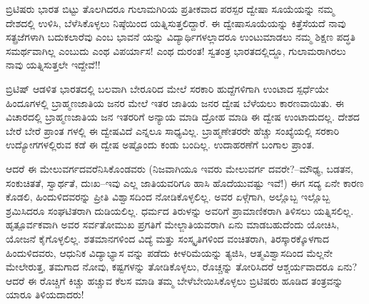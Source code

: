 ಬ್ರಿಟಿಷರು ಭಾರತ ಬಿಟ್ಟು ತೊಲಗಿದರೂ ಗುಲಾಮಗಿರಿಯ ಪ್ರತೀಕವಾದ ಪರಸ್ಪರ ದ್ವೇಷಾ ಸೂಯೆಯನ್ನು ನಮ್ಮ ದೇಶದಲ್ಲಿ ಉಳಿಸಿ, ಬೆಳೆಸಿಕೊಳ್ಳಲು ನಿಷ್ಠೆಯಿಂದ ಯತ್ನಿಸುತ್ತಲಿದ್ದಾರೆ. ಈ ದ್ವೇಷಾಸೂಯೆಯನ್ನು ಕಿತ್ತೆಸೆಯದೆ ನಾವು ಸತ್ಪ್ರಜೆಗಳಾಗಿ ಬದುಕಲಾರೆವು ಎಂಬ ಭಾವನೆ ಯನ್ನು ವಿದ್ಯಾರ್ಥಿಗಳಲ್ಲಾದರೂ ಉಂಟುಮಾಡಲು ನಮ್ಮ ಶಿಕ್ಷಣ ಪದ್ಧತಿ ಸಮರ್ಥವಾಗಿಲ್ಲ ಎಂಬುದು ಎಂಥ ವಿಪರ್ಯಾಸ! ಎಂಥ ದುರಂತ! ಸ್ವತಂತ್ರ ಭಾರತದಲ್ಲಿದ್ದೂ, ಗುಲಾಮರಾಗಿರಲು ನಾವು ಯತ್ನಿಸುತ್ತಲೇ ಇದ್ದೇವೆ!!

ಬ್ರಿಟಿಷ್ ಆಡಳಿತ ಭಾರತದಲ್ಲಿ ಬಲವಾಗಿ ಬೇರೂರಿದ ಮೇಲೆ ಸರಕಾರಿ ಹುದ್ದೆಗಳಿಗಾಗಿ ಉಂಟಾದ ಸ್ಪರ್ಧೆಯೇ ಹಿಂದೂಗಳಲ್ಲಿ ಬ್ರಾಹ್ಮಣಜಾತಿಯ ಜನರ ಮೇಲೆ ಇತರ ಜಾತಿಯ ಜನರ ದ್ವೇಷ ಬೆಳೆಯಲು ಕಾರಣವಾಯಿತು. ಈ ವಿಚಾರದಲ್ಲಿ ಬ್ರಾಹ್ಮಣಜಾತಿಯ ಜನ ಇತರರಿಗೆ ಅನ್ಯಾಯ ಮಾಡಿ ದ್ರೋಹ ಮಾಡಿ ಈ ದ್ವೇಷ ಉಂಟಾದುದಲ್ಲ. ದೇಶದ ಬೇರೆ ಬೇರೆ ಪ್ರಾಂತ ಗಳಲ್ಲಿ ಈ ದ್ವೇಷವಿದೆ ಎನ್ನಲೂ ಸಾಧ್ಯವಿಲ್ಲ. ಬ್ರಾಹ್ಮಣೇತರರೇ ಹೆಚ್ಚು ಸಂಖ್ಯೆಯಲ್ಲಿ ಸರಕಾರಿ ಉದ್ಯೋಗಗಳಲ್ಲಿರುವ ಕಡೆ ಈ ದ್ವೇಷ ಅಷ್ಟೊಂದು ಕಂಡು ಬಂದಿಲ್ಲ. ಉದಾಹರಣೆಗೆ ಬಂಗಾಲ ಪ್ರಾಂತ.

ಆದರೆ ಈ ಮೇಲುವರ್ಗದವರೆನಿಸಿಕೊಂಡವರು (ನಿಜವಾಗಿಯೂ ಇವರು ಮೇಲುವರ್ಗ ದವರೇ?–ಮೌಢ್ಯ, ಬಡತನ, ಸಂಕುಚಿತತೆ, ಸ್ವಾರ್ಥತೆ, ದುಃಖ–ಇವು ಎಲ್ಲ ಜಾತಿಯವರಿಗೂ ಹಾಸಿ ಹೊದೆಯುವಷ್ಟು ಇವೆ!) ಈಗ ಸದ್ಯ ಏನೇ ಕಾರಣ ಕೊಡಲಿ, ಹಿಂದುಳಿದವರನ್ನು ಪ್ರೀತಿ ವಿಶ್ವಾಸದಿಂದ ನೋಡಿಕೊಳ್ಳಲಿಲ್ಲ. ಅವರ ಏಳ್ಗೆಗಾಗಿ, ಅಲ್ಲೊಬ್ಬ ಇಲ್ಲೊಬ್ಬ ಶ್ರಮಿಸಿದರೂ ಸಂಘಟಿತರಾಗಿ ದುಡಿಯಲಿಲ್ಲ. ಧರ್ಮದ ತಿರುಳನ್ನು ಅವರಿಗೆ ಪ್ರಾಮಾಣಿಕರಾಗಿ ತಿಳಿಸಲು ಯತ್ನಿಸಲಿಲ್ಲ. ಹೃತ್ಪೂರ್ವಕವಾಗಿ ಅವರ ಸರ್ವತೋಮುಖ ಪ್ರಗತಿಗೆ ಮೇಲ್ಜಾತಿಯವರಾಗಿ ಏನು ಮಾಡಬಹುದೆಂದು ಯೋಚಿಸಿ, ಯೋಜನೆ ಕೈಗೊಳ್ಳಲಿಲ್ಲ. ಶತಮಾನಗಳಿಂದ ವಿದ್ಯೆ ಮತ್ತು ಸಂಸ್ಕೃತಿಗಳಿಂದ ವಂಚಿತರಾಗಿ, ತಿರಸ್ಕಾರಕ್ಕೊಳಗಾದ ಹಿಂದುಳಿದವರು, ಆಧುನಿಕ ವಿದ್ಯಾಭ್ಯಾಸ ವನ್ನು ಪಡೆದು ಕೀಳರಿಮೆಯನ್ನು ತ್ಯಜಿಸಿ, ಆತ್ಮವಿಶ್ವಾಸದಿಂದ ಮೆಲ್ಲನೇ ಮೇಲೇರುತ್ತ, ತಮಗಾದ ನೋವು, ಕಷ್ಟಗಳನ್ನು ತೋಡಿಕೊಳ್ಳಲು, ರೊಚ್ಚನ್ನು ತೋರಿಸಿದರೆ ಆಶ್ಚರ್ಯವಾದರೂ ಏನು? ಆದರೆ ಈ ರೊಚ್ಚಿಗೆ ಕಿಚ್ಚು ಹಚ್ಚುವ ಕೆಲಸ ಮಾಡಿ ತಮ್ಮ ಬೇಳೆಬೇಯಿಸಿಕೊಳ್ಳಲು ಬ್ರಿಟಿಷರು ಹೂಡಿದ ತಂತ್ರವನ್ನು ಯಾರೂ ತಿಳಿಯದಾದರು!


